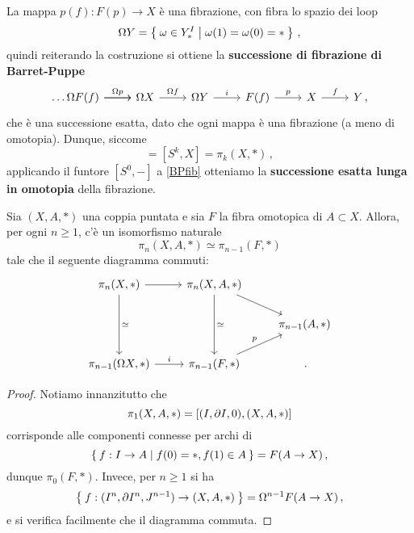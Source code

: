 La mappa $p(f):F(p) \to X$ è una fibrazione, 
con fibra lo spazio dei loop 
\begin{equation*}
	\Omega Y = \Set{\omega \in Y^{I}_{\ast} | \omega(1) = \omega(0) = \ast}\,,
\end{equation*}
quindi reiterando la costruzione
si ottiene la \textbf{successione di fibrazione di Barret-Puppe}
\begin{equation}
	\begin{tikzcd}\label{BPfib}
		\dots \ar[r] \Omega F(f) \ar[r, "\Omega p"]
		& \Omega X \ar[r, "\Omega f"]
		& \Omega Y \ar[r, "i"]
		& F(f) \ar[r, "p"]
		& X \ar[r,"f"]
		& Y\,,
	\end{tikzcd}
\end{equation}
che è una successione esatta,
dato che ogni mappa è una fibrazione
(a meno di omotopia).
Dunque, siccome
\begin{equation*}
	[S^{0},\Omega^{k}X] = [S^{k}, X] = \pi_{k}(X,\ast)\,,
\end{equation*}
applicando il funtore $[S^{0},-]$ a \eqref{BPfib}
otteniamo la \textbf{successione esatta lunga in omotopia}
della fibrazione.

\begin{lemma}\label{lemma-htpfib}
	Sia $(X, A,\ast)$ una coppia puntata e sia $F$ la fibra
	omotopica di $A \subset X$.
	Allora, per ogni $n \ge 1$, c'è un isomorfismo naturale
	\begin{equation*}
		\pi_{n}(X,A,\ast) \simeq \pi_{n-1}(F,\ast)
	\end{equation*}
	tale che il seguente diagramma commuti:
	\begin{equation*}
		\begin{tikzcd}
			\pi_{n}(X,\ast) \ar[r] \ar[dd, "\simeq"]
			& \pi_{n}(X,A,\ast) \ar[dd, "\simeq"] \ar[dr] & \\
			& & \pi_{n-1}(A, \ast) \\
			\pi_{n-1}(\Omega X, \ast) \ar[r, "i"]
			& \pi_{n-1}(F,\ast) \ar[ur, "p"] & \,.
		\end{tikzcd}
	\end{equation*}
	\begin{proof}%
		Notiamo innanzitutto che
		\begin{equation*}
			\pi_{1}(X,A,\ast) = [(I, \partial I, 0), (X,A,\ast)]
		\end{equation*}
		corrisponde alle componenti connesse per archi di
		\begin{equation*}
			\Set{f:I \to A| f(0) = \ast, f(1) \in A} = F(A \to X)\,,
		\end{equation*}
		dunque $\pi_{0}(F, \ast)$. Invece, per $n \ge 1$ si ha
		\begin{equation*}
			\Set{f:(I^{n}, \partial I^{n}, J^{n-1}) \to (X,A,\ast)}
			= \Omega^{n-1} F(A \to X)\,,
		\end{equation*}
		e si verifica facilmente che il diagramma commuta.
	\end{proof}
\end{lemma}

